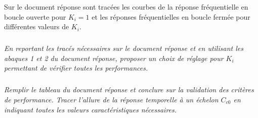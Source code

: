 \documentclass[10pt,fleqn]{article} %
\begin{document}
Sur le document réponse sont tracées les courbes de la réponse fréquentielle en boucle ouverte pour
$K_i=1$ et les réponses fréquentielles en boucle fermée pour différentes valeurs de $K_i$.


\subparagraph{}
\textit{En reportant les tracés nécessaires sur le document réponse et en utilisant les abaques 1 et 2 du
document réponse, proposer un choix de réglage pour $K_i$ permettant de vérifier toutes les
performances.}
\ifprof
\begin{corrige}
\end{corrige}
\else
\fi


\subparagraph{}
\textit{Remplir le tableau du document réponse et conclure sur la validation des critères de performance.
Tracer l’allure de la réponse temporelle à un échelon $C_{c0}$ en indiquant toutes les valeurs caractéristiques
nécessaires.}

\ifprof
\begin{corrige}

\end{corrige}
\else
\fi

\end{document}
